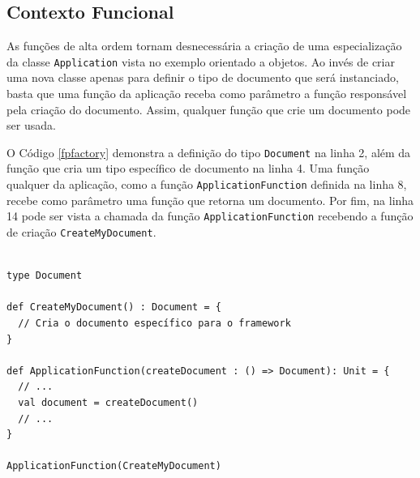 \subsection*{Contexto Funcional}

As funções de alta ordem tornam desnecessária 
a criação de uma especialização da classe 
\texttt{Application} vista no exemplo orientado a 
objetos. Ao invés de criar uma nova classe 
apenas para definir o tipo de documento 
que será instanciado, basta que 
uma função da aplicação receba como parâmetro 
a função responsável pela criação do documento. 
Assim, qualquer função que crie um documento 
pode ser usada. 

O Código \ref{fpfactory} demonstra a definição 
do tipo \texttt{Document} na linha 2, além da função 
que cria um tipo específico de documento na 
linha 4. Uma função qualquer da aplicação, 
como a função \texttt{ApplicationFunction} 
definida na linha 8, recebe como parâmetro 
uma função que retorna um documento. Por 
fim, na linha 14 pode ser vista a chamada 
da função \texttt{ApplicationFunction} recebendo a 
função de criação \texttt{CreateMyDocument}.

\begin{lstlisting}[caption={\textit{Factory Method} Funcional.},label=fpfactory]
    
type Document

def CreateMyDocument() : Document = {
  // Cria o documento específico para o framework
}

def ApplicationFunction(createDocument : () => Document): Unit = {
  // ...
  val document = createDocument()
  // ...
}

ApplicationFunction(CreateMyDocument)

\end{lstlisting}

